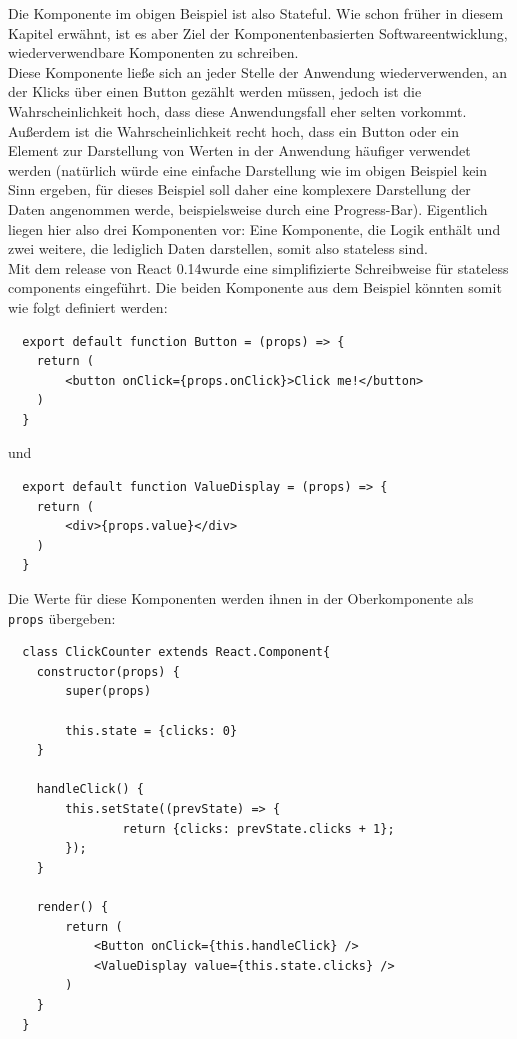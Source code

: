Die Komponente im obigen Beispiel ist also Stateful. Wie schon früher in diesem Kapitel erwähnt, ist es aber Ziel der Komponentenbasierten Softwareentwicklung, wiederverwendbare Komponenten zu schreiben.\\
Diese Komponente ließe sich an jeder Stelle der Anwendung wiederverwenden, an der Klicks über einen Button gezählt werden müssen, jedoch ist die Wahrscheinlichkeit hoch, dass diese Anwendungsfall eher selten vorkommt. Außerdem ist die Wahrscheinlichkeit recht hoch, dass ein Button oder ein Element zur Darstellung von Werten in der Anwendung häufiger verwendet werden (natürlich würde eine einfache Darstellung wie im obigen Beispiel kein Sinn ergeben, für dieses Beispiel soll daher eine komplexere Darstellung der Daten angenommen werde, beispielsweise durch eine Progress-Bar).
Eigentlich liegen hier also drei Komponenten vor: Eine Komponente, die Logik enthält und zwei weitere, die lediglich Daten darstellen, somit also stateless sind.\\

Mit dem release von React 0.14\footnotemark wurde eine simplifizierte Schreibweise für stateless components eingeführt. Die beiden Komponente aus dem Beispiel könnten somit wie folgt definiert werden:


\begin{lstlisting}
  export default function Button = (props) => {
  	return (
  		<button onClick={props.onClick}>Click me!</button>
  	)
  }
\end{lstlisting}

und

\begin{lstlisting}
  export default function ValueDisplay = (props) => {
  	return (
  		<div>{props.value}</div>
  	)
  }
\end{lstlisting}

Die Werte für diese Komponenten werden ihnen in der Oberkomponente als \verb|props| übergeben:

\begin{lstlisting}
  class ClickCounter extends React.Component{
  	constructor(props) {
  		super(props)

  		this.state = {clicks: 0}
  	}

    handleClick() {
  		this.setState((prevState) => {
    			return {clicks: prevState.clicks + 1};
  		});
  	}

  	render() {
  		return (
  			<Button onClick={this.handleClick} />
  			<ValueDisplay value={this.state.clicks} />
  		)
  	}
  }
\end{lstlisting}

